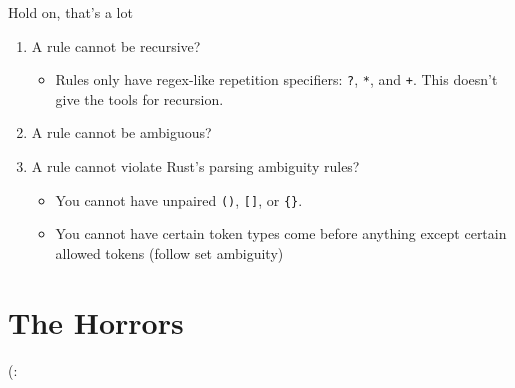 \documentclass{beamer}
\begin{document}
	\begin{frame}{Hold on, that's a lot}
		\begin{enumerate}
			\item A rule cannot be recursive?
			\pause
			\begin{itemize}
				\item Rules only have regex-like repetition specifiers: \texttt{?}, \texttt{*}, and
				\texttt{+}. This doesn't give the tools for recursion.
			\end{itemize}

			\pause

			\item A rule cannot be ambiguous?
			\pause

			\pause

			\item A rule cannot violate Rust's parsing ambiguity rules?
			\pause
			\begin{itemize}
				\item You cannot have unpaired \texttt{()}, \texttt{[]}, or \texttt{\{\}}.
				\item You cannot have certain token types come before anything except certain allowed
				tokens (follow set ambiguity)
			\end{itemize}
		\end{enumerate}
	\end{frame}

	\section*{The Horrors}
	\begin{frame}{(:}
		\begin{center}
			
		\end{center}
	\end{frame}
\end{document}
